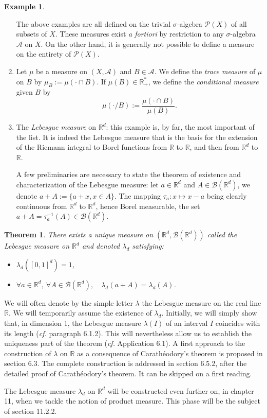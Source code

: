 \documentclass[12pt]{article}
\newtheorem{theorem}{Theorem}[section]
\theoremstyle{definition}
\newtheorem{example}{Example}[section]
\begin{document}
\begin{example}
\begin{enumerate}[label=\textbf{\arabic*.}, leftmargin=1.5em]
    The above examples are all defined on the trivial $\sigma$-algebra $\mathscr{P}(X)$ of all subsets of $X$. These measures exist \textit{a fortiori} by restriction to any $\sigma$-algebra $\mathscr{A}$ on $X$. On the other hand, it is generally not possible to define a measure on the entirety of $\mathscr{P}(X)$.

    \item Let $\mu$ be a measure on $(X, \mathscr{A})$ and $B \in \mathscr{A}$. We define the \textit{trace measure} of $\mu$ on $B$ by $\mu_B := \mu(\cdot \cap B)$. If $\mu(B) \in \mathbb{R}_+^*$, we define the \textit{conditional measure} given $B$ by
    $$ \mu(\cdot / B) := \frac{\mu(\cdot \cap B)}{\mu(B)}. $$

    \item The \textit{Lebesgue measure} on $\mathbb{R}^d$: this example is, by far, the most important of the list. It is indeed the Lebesgue measure that is the basis for the extension of the Riemann integral to Borel functions from $\mathbb{R}$ to $\mathbb{R}$, and then from $\mathbb{R}^d$ to $\mathbb{R}$.
    
    A few preliminaries are necessary to state the theorem of existence and characterization of the Lebesgue measure: let $a \in \mathbb{R}^d$ and $A \in \mathscr{B}(\mathbb{R}^d)$, we denote $a + A := \{a + x, x \in A\}$. The mapping $\tau_a : x \mapsto x - a$ being clearly continuous from $\mathbb{R}^d$ to $\mathbb{R}^d$, hence Borel measurable, the set $a + A = \tau_a^{-1}(A) \in \mathscr{B}(\mathbb{R}^d)$.
\end{enumerate}
\end{example}

\begin{theorem}
There exists a unique measure on $(\mathbb{R}^d, \mathscr{B}(\mathbb{R}^d))$ called the \textit{Lebesgue measure} on $\mathbb{R}^d$ and denoted $\lambda_d$ satisfying:
\begin{itemize}
    \item[(i)] $\lambda_d([0, 1]^d) = 1$,
    \item[(ii)] $\forall a \in \mathbb{R}^d, \ \forall A \in \mathscr{B}(\mathbb{R}^d), \quad \lambda_d(a + A) = \lambda_d(A)$.
\end{itemize}
\end{theorem}

We will often denote by the simple letter $\lambda$ the Lebesgue measure on the real line $\mathbb{R}$. We will temporarily assume the existence of $\lambda_d$. Initially, we will simply show that, in dimension 1, the Lebesgue measure $\lambda(I)$ of an interval $I$ coincides with its length (\textit{cf.} paragraph 6.1.2). This will nevertheless allow us to establish the uniqueness part of the theorem (\textit{cf.} Application 6.1). A first approach to the construction of $\lambda$ on $\mathbb{R}$ as a consequence of Carathéodory's theorem is proposed in section 6.3. The complete construction is addressed in section 6.5.2, after the detailed proof of Carathéodory's theorem. It can be skipped on a first reading.

The Lebesgue measure $\lambda_d$ on $\mathbb{R}^d$ will be constructed even further on, in chapter 11, when we tackle the notion of product measure. This phase will be the subject of section 11.2.2.
\end{document}
